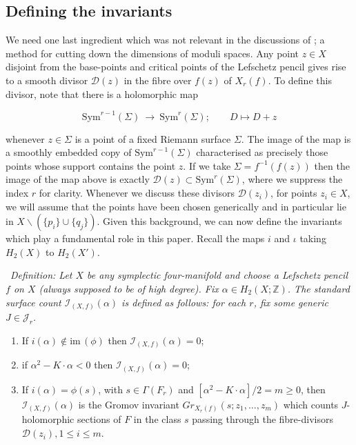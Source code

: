 \documentclass[10pt]{article}
\newcommand{\zz}{\mathbb{Z}}
\newcommand{\im}{\mathrm{im \,}}
\newcommand{\Sym}{\mathrm{Sym}}
\newcounter{Universal}[section]
\renewcommand{\theUniversal}{\thesection.\arabic{Universal}}
\newenvironment{Italic}{\refstepcounter{Universal} \par \vspace{0.5cm}
\noindent {\bf (\theUniversal)}\ \it}{\par \vspace{0.5cm}}
\newenvironment{Defn}{\begin{Italic}{\sc Definition: } }{\end{Italic}}
\newcounter{enum}
\begin{document}

\subsection{Defining the invariants}

We need one last ingredient which was not relevant in the discussions
of \cite{SKDIS}; a method for cutting down the dimensions of moduli
spaces.  Any point $z \in
X$ disjoint from the base-points and critical points of the Lefschetz
pencil gives rise to a smooth divisor $\mathcal{D}(z)$ in the fibre
over $f(z)$ of 
$X_r(f)$.  To define this divisor, note that there is a holomorphic
map

$$\Sym^{r-1}(\Sigma) \ \rightarrow \ \Sym^r(\Sigma); \qquad D \mapsto D+z$$

\noindent whenever $z \in \Sigma$ is a point of a fixed Riemann
surface $\Sigma$.  The image of the map is a smoothly embedded copy of
$\Sym^{r-1}(\Sigma)$ characterised as precisely those points whose
support contains the point $z$.  If we take $\Sigma = f^{-1}(f(z))$
then the image of the map above is exactly $\mathcal{D}(z) \subset
\Sym^r (\Sigma)$, where we suppress the index $r$ for clarity.
Whenever we discuss these divisors $\mathcal{D}(z_i)$, for points
$z_i \in X$, we will assume that the points have been chosen
generically and in particular lie in $X \backslash (\{ p_i\} \cup 
\{ q_j \})$.  Given this
background, we can now define the invariants which play a fundamental role
in this paper.  Recall the maps $i$ and $\iota$ taking $H_2(X)$ to $H_2(X')$.

\begin{Defn} \label{CountSS}
Let $X$ be any symplectic four-manifold and choose a Lefschetz pencil
$f$ on $X$ (always supposed to be of high degree).  Fix $\alpha \in
H_2 (X; \zz)$.   
The \emph{standard surface count} $\mathcal{I}_{(X,f)}(\alpha)$ is
defined as follows: for each $r$, fix some generic $J \in \mathcal{J}_r$.

\begin{enumerate}
\item If $i(\alpha) \not \in \im(\phi)$ then $\mathcal{I}_{(X,f)}(\alpha)
  = 0$; 
\item if $\alpha^2 - K \cdot \alpha < 0$ then
  $\mathcal{I}_{(X,f)}(\alpha) = 0$;
\item If $i(\alpha) = \phi(s)$, with $s \in \Gamma(F_r)$ and
  $[\alpha^2 - K \cdot \alpha]/2 = m \geq 0$, then
  $\mathcal{I}_{(X,f)}(\alpha)$ is the Gromov invariant
  $Gr_{X_r(f)}(s; z_1, \ldots, z_m)$ which counts $J$-holomorphic sections
of $F$ in the class $s$ passing through the fibre-divisors
$\mathcal{D}(z_i), 1 \leq i \leq m$.
\end{enumerate}
\end{Defn}
\end{document}
